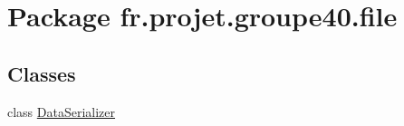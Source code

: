 \hypertarget{namespacefr_1_1projet_1_1groupe40_1_1file}{}\section{Package fr.\+projet.\+groupe40.\+file}
\label{namespacefr_1_1projet_1_1groupe40_1_1file}
\subsection*{Classes}
\begin{DoxyCompactItemize}
\item 
class \hyperlink{classfr_1_1projet_1_1groupe40_1_1file_1_1_data_serializer}{Data\+Serializer}
\end{DoxyCompactItemize}
